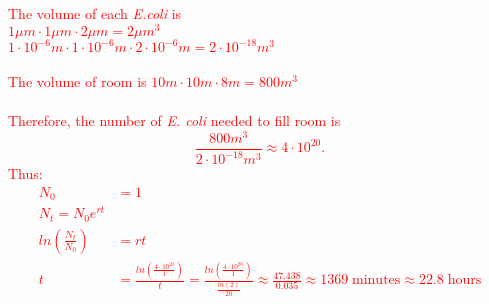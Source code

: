 \documentclass{article}
\newcommand{\ind}{\-\hspace{1cm}}
\begin{document}
\vspace{0.1cm}
\textcolor{red}{
The volume of each \emph{E.coli} is \\
\ind $1\mu m \cdot 1\mu m \cdot 2\mu m = 2\mu m^3$ \\
\ind $ 1\cdot 10^{-6}m \cdot 1\cdot 10^{-6}m \cdot 2\cdot 10^{-6}m = 2 \cdot 10^{-18}m^3$\\ 
\\
The volume of room is
\ind $10 m \cdot 10 m \cdot 8 m = 800m^3$\\
\\
Therefore, the number of \emph{E. coli} needed to fill room is
\begin{equation*}
	\frac{800 m^3}{2 \cdot 10^{-18} m^3}\approx 4 \cdot 10^{20}.
\end{equation*}
Thus:\\
\begin{align*}
	N_0&=1\\
	N_t=N_0 e^{rt}\\
	ln\left(\frac{N_t}{N_0}\right)&=rt\\
	t&=\frac{ln \left(\frac{4\cdot 10^{20}}{1}\right)}{t}=\frac{ln \left(\frac{4\cdot 10^{20}}{1}\right)}{\frac{ln(2)}{20}} \approx \frac{47.438}{0.035} \approx 1369 \; \text{minutes} \approx 22.8 \; \text{hours}
\end{align*}}
\end{document}
